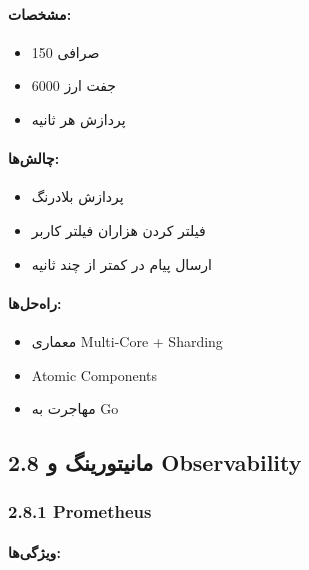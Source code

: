 \documentclass[
]{article}
\providecommand{\tightlist}{%
  \setlength{\itemsep}{0pt}\setlength{\parskip}{0pt}}
\begin{document}
\paragraph{مشخصات:}\label{ux645ux634ux62eux635ux627ux62a-1}

\begin{itemize}
\tightlist
\item
  150 صرافی
\item
  6000 جفت ارز
\item
  پردازش هر ثانیه
\end{itemize}

\paragraph{چالش‌ها:}\label{ux686ux627ux644ux634ux647ux627-1}

\begin{itemize}
\tightlist
\item
  پردازش بلادرنگ
\item
  فیلتر کردن هزاران فیلتر کاربر
\item
  ارسال پیام در کمتر از چند ثانیه
\end{itemize}

\paragraph{راه‌حل‌ها:}\label{ux631ux627ux647ux62dux644ux647ux627-1}

\begin{itemize}
\tightlist
\item
  معماری Multi-Core + Sharding
\item
  Atomic Components
\item
  مهاجرت به Go
\end{itemize}

\subsection{2.8 مانیتورینگ و
Observability}\label{ux645ux627ux646ux6ccux62aux648ux631ux6ccux646ux6af-ux648-observability}

\subsubsection{2.8.1 Prometheus}\label{prometheus}

\paragraph{ویژگی‌ها:}\label{ux648ux6ccux698ux6afux6ccux647ux627}
\end{document}
